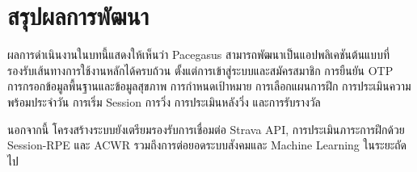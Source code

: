 \section{สรุปผลการพัฒนา}

ผลการดำเนินงานในบทนี้แสดงให้เห็นว่า Pacegasus สามารถพัฒนาเป็นแอปพลิเคชันต้นแบบที่รองรับเส้นทางการใช้งานหลักได้ครบถ้วน ตั้งแต่การเข้าสู่ระบบและสมัครสมาชิก การยืนยัน OTP การกรอกข้อมูลพื้นฐานและข้อมูลสุขภาพ การกำหนดเป้าหมาย การเลือกแผนการฝึก การประเมินความพร้อมประจำวัน การเริ่ม Session การวิ่ง การประเมินหลังวิ่ง และการรับรางวัล

นอกจากนี้ โครงสร้างระบบยังเตรียมรองรับการเชื่อมต่อ Strava API, การประเมินภาระการฝึกด้วย Session-RPE และ ACWR รวมถึงการต่อยอดระบบสังคมและ Machine Learning ในระยะถัดไป
